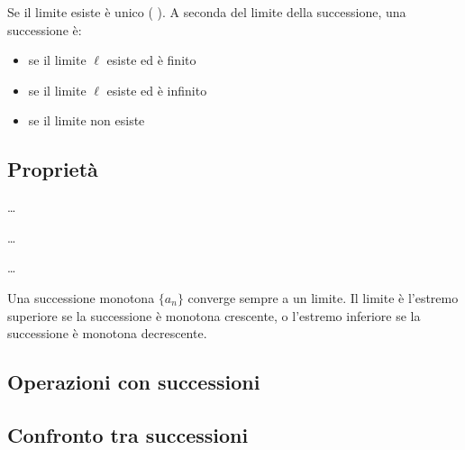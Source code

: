 \documentclass[letterpaper,10pt,italian]{jupyterBook}
\begin{document}
\sphinxAtStartPar
Se il limite esiste è unico ( ). A seconda del limite della successione, una successione è:
\begin{itemize}
\item {} 
\sphinxAtStartPar
{} se il limite \(\ell\) esiste ed è finito

\item {} 
\sphinxAtStartPar
{} se il limite \(\ell\) esiste ed è infinito

\item {} 
\sphinxAtStartPar
{} se il limite non esiste

\end{itemize}


\subsection{Proprietà}
\label{\detokenize{ch/series:proprieta}}
\sphinxAtStartPar
{} …

\sphinxAtStartPar
{} …

\sphinxAtStartPar
{} …

\sphinxAtStartPar
{} Una successione monotona \(\{ a_n \}\) converge sempre a un limite. Il limite è l’estremo superiore se la successione è monotona crescente, o l’estremo inferiore se la successione è monotona decrescente.

\sphinxAtStartPar
{}

\sphinxAtStartPar
{}


\subsection{Operazioni con successioni}
\label{\detokenize{ch/series:operazioni-con-successioni}}
\sphinxAtStartPar
{}


\subsection{Confronto tra successioni}
\label{\detokenize{ch/series:confronto-tra-successioni}}
\sphinxAtStartPar
{}
\end{document}
